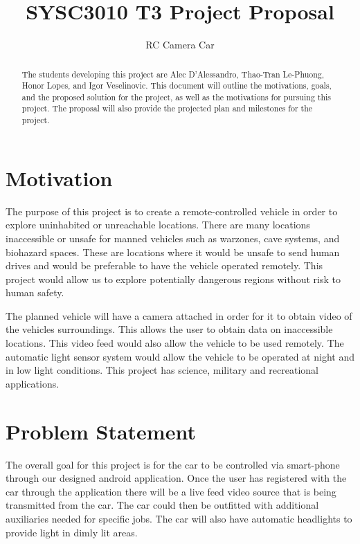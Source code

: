 \documentclass[letterpaper,12pt]{report}
\begin{document}
	\title{SYSC3010 T3 Project Proposal}
	\author{RC Camera Car}
	\date{}
	\maketitle

	\begin{abstract}
		The students developing this project are Alec D'Alessandro, Thao-Tran
		Le-Phuong, Honor Lopes, and Igor Veselinovic. This document will outline
		the motivations, goals, and the proposed solution for the project, as
		well as the motivations for pursuing this project. The proposal will
		also provide the projected plan and milestones for the project.
	\end{abstract}

	\tableofcontents

	\pagebreak

	\section*{Motivation}
	\markright{}
	The purpose of this project is to create a remote-controlled vehicle in
	order to explore uninhabited or unreachable locations. There are many
	locations inaccessible or unsafe for manned vehicles such as warzones, cave
	systems, and biohazard spaces. These are locations where it would be unsafe
	to send human drives and would be preferable to have the vehicle operated
	remotely. This project would allow us to explore potentially dangerous
	regions without risk to human safety.

	The planned vehicle will have a camera attached in order for it to obtain
	video of the vehicles surroundings. This allows the user to obtain data on
	inaccessible locations. This video feed would also allow the vehicle to be
	used remotely. The automatic light sensor system would allow the vehicle to
	be operated at night and in low light conditions. This project has science,
	military and recreational applications.

	\section*{Problem Statement}
	\markright{}
	The overall goal for this project is for the car to be controlled via
	smart-phone through our designed android application. Once the user has
	registered with the car through the application there will be a live feed
	video source that is being transmitted from the car. The car could then be
	outfitted with additional auxiliaries needed for specific jobs. The car will
	also have automatic headlights to provide light in dimly lit areas.
\end{document}
